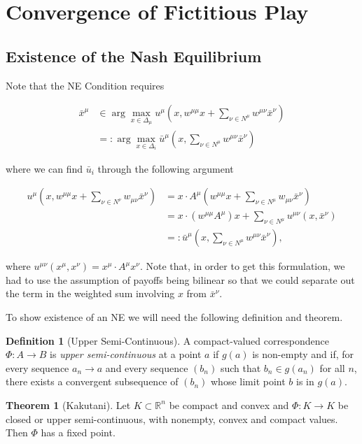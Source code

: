 \documentclass{article}
\theoremstyle{definition}
\newtheorem*{definition}{Definition}
\newtheorem{theorem}{Theorem}
\newcommand{\xmu}{x^{\mu}}
\newcommand{\NE}[1]{\bar{x}^{#1}}
\begin{document}
	\section{Convergence of Fictitious Play}

	\subsection{Existence of the Nash Equilibrium}
	
	Note that the NE Condition requires

	\begin{align}
		\NE{\mu} &\in \arg\max_{x \in \Delta_\mu} u^\mu(x, w^{\mu \mu}x + \sum_{\nu \in N^\mu} w^{\mu \nu} \NE{\nu}) \nonumber \\
		& =: \arg\max_{x \in \Delta_i} \bar{u}^\mu(x, \sum_{\nu \in N^\mu} w^{\mu \nu} \NE{\nu})
	\end{align}

	where we can find $\bar{u}_i$ through the following argument
	
	\begin{align}
		u^\mu(x, w^{\mu \mu} x + \sum_{\nu \in N^\nu} w_{\mu \nu} \NE{\nu}) & = x \cdot A^\mu (w^{\mu \mu} x + \sum_{\nu \in N^\mu} w_{\mu \nu} \NE{\nu}) \\
		 & = x \cdot (w^{\mu \mu} A^\mu)  x + \sum_{\nu \in N^\mu} u^{\mu \nu}(x, \NE{\nu}) \\
		 & =: \bar{u}^\mu(x, \sum_{\nu \in N^\mu} w^{\mu \nu} \NE{\nu}), \nonumber
	\end{align}
	
	where $u^{\mu \nu}(\xmu, x^\nu) = \xmu \cdot A^\mu x^\nu$. Note that, in order to get this
	formulation, we had to use the assumption of payoffs being bilinear so that we could separate
	out the term in the weighted sum involving $x$ from $\bar{x}^\nu$. 
	
	To show existence of an NE we will need the following definition and theorem.

	\begin{definition}[Upper Semi-Continuous]
		A compact-valued correspondence $\Phi: A \rightarrow B$ is \emph{upper semi-continuous} at a point $a$ if $g(a)$ is non-empty and if, for every sequence $a_n \rightarrow a$ and every sequence $(b_n)$ such that $b_n \in g(a_n)$ for all $n$, there exists a convergent subsequence of $(b_n)$ whose limit point $b$ is in $g(a)$.  
	\end{definition}

	\begin{theorem}[Kakutani]
		Let $K \subset \mathbb{R}^n$ be compact and convex and $\Phi: K \rightarrow K$ be closed or upper semi-continuous, with nonempty, convex and compact values. Then $\Phi$ has a fixed point.
	\end{theorem}
\end{document}
